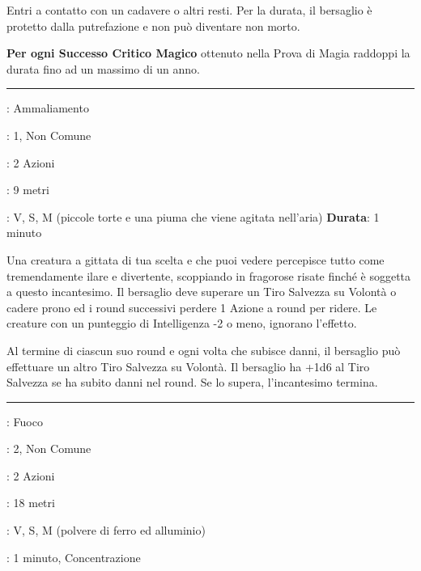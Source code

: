 \begin{multicols}{2}
Entri a contatto con un cadavere o altri resti. Per la durata, il bersaglio è protetto dalla putrefazione e non può diventare non morto.

\textbf{Per ogni Successo Critico Magico} ottenuto nella Prova di Magia raddoppi la durata fino ad un massimo di un anno.

\smallskip\noindent\rule{\linewidth}{2pt} \hypertarget{Risata Incontenibile}{}\smallskip{}
\noindent
\begin{description}[noitemsep, topsep=0pt, parsep=0pt, partopsep=0pt, leftmargin=0cm, labelwidth=2.8cm]
	\item[\textbf{Lista di Magia}]: Ammaliamento
	\item[\textbf{Livello}]: 1, Non Comune
	\item[\textbf{T. di Lancio}]: 2 Azioni
	\item[\textbf{Gittata}]: 9 metri
	\item[\textbf{Componenti}]: V, S, M (piccole torte e una piuma che viene agitata nell'aria)
	\textbf{Durata}: 1 minuto
\end{description}
Una creatura a gittata di tua scelta e che puoi vedere percepisce tutto come tremendamente ilare e divertente, scoppiando in fragorose risate finché è soggetta a questo incantesimo. Il bersaglio deve superare un Tiro Salvezza su Volontà o cadere prono ed i round successivi perdere 1 Azione a round per ridere. Le creature con un punteggio di Intelligenza -2 o meno, ignorano l'effetto.

Al termine di ciascun suo round e ogni volta che subisce danni, il bersaglio può effettuare un altro Tiro Salvezza su Volontà. Il bersaglio ha +1d6 al Tiro Salvezza se ha subito danni nel round. Se lo supera, l'incantesimo termina.

\smallskip\noindent\rule{\linewidth}{2pt} \hypertarget{Riscaldare il Metallo}{}\smallskip{}
\noindent
\begin{description}[noitemsep, topsep=0pt, parsep=0pt, partopsep=0pt, leftmargin=0cm, labelwidth=2.8cm]
	\item[\textbf{Lista di Magia}]: Fuoco
	\item[\textbf{Livello}]: 2, Non Comune
	\item[\textbf{T. di Lancio}]: 2 Azioni
	\item[\textbf{Gittata}]: 18 metri
	\item[\textbf{Componenti}]: V, S, M (polvere di ferro ed alluminio)
	\item[\textbf{Durata}]: 1 minuto, Concentrazione
\end{description}


\end{multicols}
